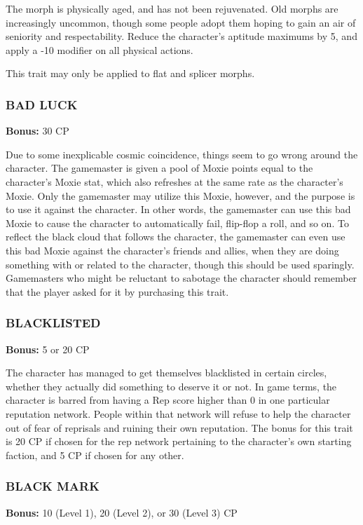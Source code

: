 The morph is physically aged, and has not been rejuvenated. Old morphs are
increasingly uncommon, though some people adopt them hoping to gain an air of
seniority and respectability. Reduce the character’s aptitude maximums by 5,
and apply a -10 modifier on all physical actions.

This trait may only be applied to flat and splicer morphs.

\subsubsection{BAD LUCK}
\textbf{Bonus:} 30 CP

Due to some inexplicable cosmic coincidence, things seem to go wrong around the
character. The gamemaster is given a pool of Moxie points equal to the
character’s Moxie stat, which also refreshes at the same rate as the
character’s Moxie. Only the gamemaster may utilize this Moxie, however, and the
purpose is to use it against the character. In other words, the gamemaster can
use this bad Moxie to cause the character to automatically fail, flip-flop a
roll, and so on. To reflect the black cloud that follows the character, the
gamemaster can even use this bad Moxie against the character’s friends and
allies, when they are doing something with or related to the character, though
this should be used sparingly.  Gamemasters who might be reluctant to sabotage
the character should remember that the player asked for it by purchasing this
trait.

\subsubsection{BLACKLISTED}
\textbf{Bonus:} 5 or 20 CP

The character has managed to get themselves blacklisted in certain circles,
whether they actually did something to deserve it or not. In game terms, the
character is barred from having a Rep score higher than 0 in one particular
reputation network. People within that network will refuse to help the
character out of fear of reprisals and ruining their own reputation. The
bonus for this trait is 20 CP if chosen for the rep network pertaining to the
character’s own starting faction, and 5 CP if chosen for any other.

\subsubsection{BLACK MARK}
\textbf{Bonus:} 10 (Level 1), 20 (Level 2), or 30 (Level 3) CP

